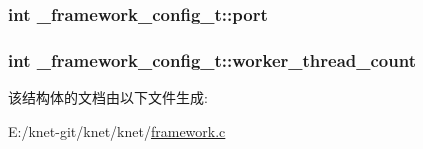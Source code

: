 \subsubsection[{port}]{\setlength{\rightskip}{0pt plus 5cm}int \+\_\+framework\+\_\+config\+\_\+t\+::port}\label{a00010_af6fc4d28729e9781be207328cb0f7f39_af6fc4d28729e9781be207328cb0f7f39}
\hypertarget{a00010_a9a064afbac56ea11a4ec150bb4df152e_a9a064afbac56ea11a4ec150bb4df152e}{}
\subsubsection[{worker\+\_\+thread\+\_\+count}]{\setlength{\rightskip}{0pt plus 5cm}int \+\_\+framework\+\_\+config\+\_\+t\+::worker\+\_\+thread\+\_\+count}\label{a00010_a9a064afbac56ea11a4ec150bb4df152e_a9a064afbac56ea11a4ec150bb4df152e}


该结构体的文档由以下文件生成\+:\begin{DoxyCompactItemize}
\item 
E\+:/knet-\/git/knet/knet/\hyperlink{a00048}{framework.\+c}\end{DoxyCompactItemize}

